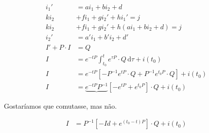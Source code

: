 \documentclass[12pt,a4paper]{article}
\begin{document}
\begin{align}
i_1' &= a i_1 + b i_2 + d \\
k i_2 &+ f i_1 + g i_2' + h i_1' = j \\
k i_2 &+ f i_1 + g i_2' + h (a i_1 + b i_2 + d) = j \\
i_2' &= a' i_1 + b' i_2 + d' \\
I' + P\cdot I &= Q \\
I &=  e^{-tP} \int_{t_0}^t e^{\tau P}\cdot Q\,\mathrm{d}\tau + i(t_0) \\
I &=  e^{-tP} \left[ - P^{-1} e^{t P}\cdot Q + P^{-1} e^{t_0 P}\cdot Q \right] + i(t_0) \\
I &=  \underbrace{e^{-tP} P^{-1}} \left[ - e^{t P} + e^{t_0 P} \right]\cdot Q + i(t_0)
\end{align}

Gostar\'iamos que comutasse, mas n\~ao.

\begin{align}
I &=   P^{-1} \left[ - Id + e^{(t_0-t)P} \right] \cdot Q + i(t_0)
\end{align}
\end{document}

